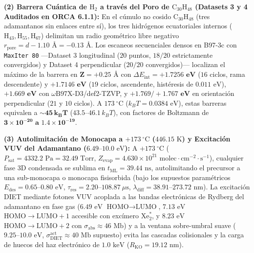 \documentclass[10pt,twocolumn,a4paper]{article}
\begin{document}
\begin{@twocolumnfalse}
{    \noindent\textbf{(2) Barrera Cuántica de $\text{H}_2$ a través del Poro de $\text{C}_{30}\text{H}_{48}$ (Datasets 3 y 4 Auditados en ORCA 6.1.1):} En el cúmulo no cosido $\text{C}_{30}\text{H}_{48}$ (tres adamantanos sin enlaces entre sí), los tres hidrógenos ecuatoriales internos ($\text{H}_{43}, \text{H}_{55}, \text{H}_{67}$) delimitan un radio geométrico libre negativo $r_{\text{pore}} = d - 1.10\text{ \AA} = \mathbf{-0.13\text{ \AA}}$. Los escaneos secuenciales densos en B97-3c con \texttt{MaxIter 80} —Dataset 3 longitudinal ($20$ puntos, $18/20$ estrictamente convergidos) y Dataset 4 perpendicular ($20/20$ convergidos)— localizan el máximo de la barrera en $\mathbf{Z = +0.25\text{ \AA}}$ con $\Delta E_{\text{int}} = \mathbf{+1.7256\text{ eV}}$ ($16$ ciclos, rama descendente) y $\mathbf{+1.7146\text{ eV}}$ ($19$ ciclos, ascendente, histéresis de $0.011\text{ eV}$), $\mathbf{+1.669\text{ eV}}$ con $\omega\text{B97X-D3}$/def2-TZVP, y $\mathbf{+1.769 / +1.767\text{ eV}}$ en orientación perpendicular ($21$ y $10$ ciclos). A $173\ ^\circ\text{C}$ ($k_B T = 0.0384\text{ eV}$), estas barreras equivalen a $\mathbf{\sim 45\,k_B T}$ ($43.5\text{--}46.1\,k_B T$), con factores de Boltzmann de $\mathbf{3 \times 10^{-20}\text{ a }1.4 \times 10^{-19}}$.

    \noindent\textbf{(3) Autolimitación de Monocapa a $+173\ ^\circ\text{C}$ ($446.15\text{ K}$) y Excitación VUV del Adamantano ($6.49\text{--}10.0\text{ eV}$):} A $+173\ ^\circ\text{C}$ ($P_{\text{sat}} = 4332.2\text{ Pa} = 32.49\text{ Torr}$, $Z_{\text{evap}} = 4.630 \times 10^{21}\text{ molec}\cdot\text{cm}^{-2}\cdot\text{s}^{-1}$), cualquier fase 3D condensada se sublima en $t_{\text{ML}} = 39.44\text{ ns}$, autolimitando el precursor a una sub-monocapa o monocapa fisisorbida (bajo los supuestos paramétricos $E_{\text{des}} = 0.65\text{--}0.80\text{ eV}$, $\tau_{\text{res}} = 2.20\text{--}108.87\ \mu\text{s}$, $\lambda_{\text{diff}} = 38.91\text{--}273.72\text{ nm}$). La excitación DIET mediante fotones VUV acoplada a las bandas electrónicas de Rydberg del adamantano en fase gas ($6.49\text{ eV}$ $\text{HOMO}\to\text{LUMO}$, $7.13\text{ eV}$ $\text{HOMO}\to\text{LUMO}+1$ accesible con excímero $\text{Xe}_2^*$, y $8.23\text{ eV}$ $\text{HOMO}\to\text{LUMO}+2$ con $\sigma_{\text{abs}} \approx 46\text{ Mb}$) y a la ventana sobre-umbral suave ($9.25\text{--}10.0\text{ eV}$, $\sigma_{\text{DIET}}^{\text{act}} \approx 40\text{ Mb}$ supuesto) evita las cascadas colisionales y la carga de huecos del haz electrónico de $1.0\text{ keV}$ ($R_{\text{KO}} = 19.12\text{ nm}$).

}
\end{@twocolumnfalse}
\end{document}
